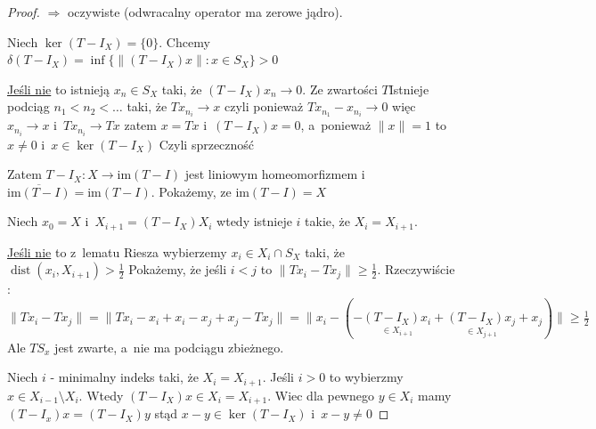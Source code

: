 \documentclass[11pt]{mwrep}
\renewcommand{\[}{\begin{equation}}
\renewcommand{\]}{\end{equation}}
\newcommand{\dist}{\operatorname{dist}}
\newcommand{\im}{\mathrm{im}}
\begin{document}
\begin{proof}
	$\Rightarrow$ oczywiste (odwracalny operator ma zerowe jądro).\par
	Niech $\ker(T-I_X) = \{0\}$. Chcemy $\delta(T-I_X) = \inf \{ \|(T-I_X) x\|: x\in S_X\} >0$\par
	\underline{Jeśli nie} to istnieją $x_n \in S_X$ taki, że $(T-I_X)x_n \to 0$.
	Ze zwartości $T$Istnieje podciąg  $n_1<n_2<\ldots$ taki, że $T{x_{n_i}} \to x$ czyli ponieważ $T x_{n_1} - x_{n_i} \to 0$
	więc $x_{n_i} \to x$ i~$T x_{n_i} \to Tx$ zatem $x=Tx$ i~$(T-I_X)x=0$, a~ponieważ $\|x\| =1$ to $x\not = 0$ i~$x \in \ker(T -I_X)$
	Czyli sprzeczność\par
	Zatem $T-I_X\colon X \to \im(T - I)$ jest liniowym homeomorfizmem i~$\overline{ \im(T - I)} =  \im(T - I)$.
	Pokażemy, ze $ \im(T - I) = X$\par
	Niech $x_0 = X$ i~$X_{i+1}=(T-I_X)X_i$ wtedy istnieje $i$ takie, że $X_i = X_{i+1}$.\par
	\underline{Jeśli nie} to z~lematu Riesza wybierzemy $x_i \in X_i\cap S_X$ taki, że $\dist(x_i, X_{i+1}) > \frac{1}{2}$ 
	Pokażemy, że jeśli $i<j$ to $\|Tx_i - Tx_j\|\ge \frac{1}{2}$.
	Rzeczywiście : $\|Tx_i - Tx_j\| = \|Tx_i -x_i +x_i -x_j +x_j - T x_j\|=\| x_i -( -\underset{\in X_{i+1}}{(T-I_X)x_i}+ 
	\underset{\in X_{j+1}}{(T-I_X)x_j}+x_j )\|
	\ge \frac{1}{2}$
	Ale $TS_x$ jest zwarte, a~nie ma podciągu zbieżnego.\par
	Niech $i$ - minimalny indeks taki, że $X_i = X_{i+1}$. Jeśli $i>0$ to wybierzmy $x \in X_{i-1}\setminus X_i$.
	Wtedy $(T-I_X) x \in X_i = X_{i+1}$. Wiec dla pewnego $y \in X_i$ mamy $ (T-I_x)x = (T-I_X)y$ stąd $x-y \in \ker(T-I_X)$ i~$x-y \not =0$
\end{proof}
\end{document}
